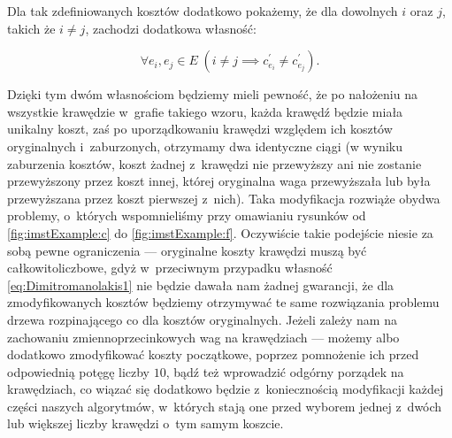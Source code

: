 Dla tak zdefiniowanych kosztów dodatkowo pokażemy, że dla dowolnych $i$ oraz $j$, takich że $i \neq j$, zachodzi dodatkowa własność:

\begin{equation}\label{eq:Dimitromanolakis2}
	\forall e_{i}, e_{j} \in E \; \left( i \neq j \implies c^{\prime}_{e_{i}} \neq c^{\prime}_{e_{j}} \right)\text{.}
\end{equation}

Dzięki tym dwóm własnościom będziemy mieli pewność, że po nałożeniu na wszystkie krawędzie w~grafie takiego wzoru, każda krawędź będzie miała unikalny koszt, zaś po uporządkowaniu krawędzi względem ich kosztów oryginalnych i~zaburzonych, otrzymamy dwa identyczne ciągi (w wyniku zaburzenia kosztów, koszt żadnej z~krawędzi nie przewyższy ani nie zostanie przewyższony przez koszt innej, której oryginalna waga przewyższała lub była przewyższana przez koszt pierwszej z~nich).
Taka modyfikacja rozwiąże obydwa problemy, o~których wspomnieliśmy przy omawianiu rysunków od \ref{fig:imstExample:c} do \ref{fig:imstExample:f}.
Oczywiście takie podejście niesie za sobą pewne ograniczenia --- oryginalne koszty krawędzi muszą być całkowitoliczbowe, gdyż w~przeciwnym przypadku własność \ref{eq:Dimitromanolakis1} nie będzie dawała nam żadnej gwarancji, że dla zmodyfikowanych kosztów będziemy otrzymywać te same rozwiązania problemu drzewa rozpinającego co dla kosztów oryginalnych.
Jeżeli zależy nam na zachowaniu zmiennoprzecinkowych wag na krawędziach --- możemy albo dodatkowo zmodyfikować koszty początkowe, poprzez pomnożenie ich przed odpowiednią potęgę liczby $10$, bądź też wprowadzić odgórny porządek na krawędziach, co wiązać się dodatkowo będzie z~koniecznością modyfikacji każdej części naszych algorytmów, w~których stają one przed wyborem jednej z~dwóch lub większej liczby krawędzi o~tym samym koszcie.

